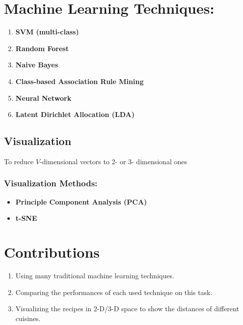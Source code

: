\documentclass{article}
\begin{document}
\section{Machine Learning Techniques:}
\begin{enumerate}
    \item \textbf{SVM (multi-class)}
    \item \textbf{Random Forest}
    \item \textbf{Naive Bayes} 
    \item \textbf{Class-based Association Rule Mining}
    \item \textbf{Neural Network}
    \item \textbf{Latent Dirichlet Allocation (LDA)}
\end{enumerate} 

\subsection{Visualization}
To reduce $V$-dimensional vectors to 2- or 3- dimensional ones

\subsubsection{Visualization Methods:}
\begin{itemize}
    \item \textbf{Principle Component Analysis (PCA)}
    \item \textbf{t-SNE} 
\end{itemize}

\section{Contributions}
\begin{enumerate}
    \item Using many traditional machine learning techniques.
    \item Comparing the performances of each used technique on this task.
    \item Visualizing the recipes in 2-D/3-D space to show the distances of different cuisines.
\end{enumerate} 
\end{document}
